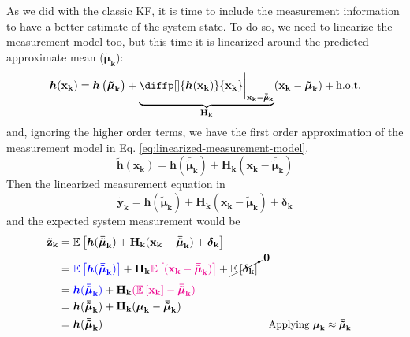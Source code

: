 \documentclass[12pt]{article}
\newcommand{\bvec}[1]{\boldsymbol{\mathbf{#1}}} %
\newcommand{\mat}[1]{\boldsymbol{\mathbf{#1}}}
\newcommand{\brac}[1]{\left[#1\right]} %
\newcommand{\parentheses}[1]{\left(#1\right)}
\newcommand{\mb}[1]{{\boldsymbol{#1}}} %
\newcommand{\expv}[1]{\mathbb{E}\brac{#1}} %
\newcommand{\hot}{\text{h.o.t.}}
\newcommand{\blue}[1]{\color{blue}#1\color{black}}
\newcommand{\magenta}[1]{\color{magenta}#1\color{black}}
\begin{document}
As we did with the classic KF, it is time to include the measurement information to have a better estimate of the system state. To do so, we need to linearize the measurement model too, but this time it is linearized around the predicted approximate mean ($\mb{\bar{\tilde{\mu}}}_\mathbf{k}$):
\begin{equation*}
    \mb{h}(\bvec{x_k}) = \mb{h}\parentheses{\mb{\bar{\tilde{\mu}}}_\mathbf{k}} + \underbrace{\diffp[]{\mb{h}(\bvec{x_k})}{\bvec{x_{k}}} \bigg\lvert_{\bvec{x_k}=\bar{\mb{\tilde{\mu}}}_\mathbf{k}}}_{\mat{H_k}} (\bvec{x_k} - \mb{\bar{\tilde{\mu}}}_\mathbf{k}) + \hot
\end{equation*}
and, ignoring the higher order terms, we have the first order approximation of the measurement model in Eq. \ref{eq:linearized-measurement-model}.
\begin{equation}
    \mb{\tilde{h}}(\bvec{x_k}) = \mb{h}(\mb{\bar{\tilde\mu}}_\mathbf{k}) + \mat{H_k} (\bvec{x_k} - \mb{\bar{\tilde\mu}}_\mathbf{k})
    \label{eq:linearized-measurement-model} 
\end{equation}
Then the linearized measurement equation in
\begin{equation}
    \bvec{\tilde{y}_k} = \mb{h}(\mb{\bar{\tilde\mu}}_\mathbf{k}) + \mat{H_k}(\bvec{x_k} - \mb{\bar{\tilde{\mu}}}_\mathbf{k}) + \mb{\delta}_\mathbf{k}
\end{equation}
and the expected system measurement would be
\begin{equation}
\begin{aligned}
    \bvec{\tilde{z}_k} &= \expv{\mb{h}(\mb{\bar{\tilde\mu}}_\mathbf{k}) + \mat{H_k}(\bvec{x_k} - \mb{\bar{\tilde{\mu}}}_\mathbf{k}) + \mb{\delta}_\mathbf{k}}\\
    &= \blue{\expv{\mb{h}(\mb{\bar{\tilde\mu}}_\mathbf{k})}} + \mat{H_k}\magenta{\expv{(\bvec{x_k} - \mb{\bar{\tilde{\mu}}}_\mathbf{k})}} + \cancelto{\mat{0}}{\expv{\mb{\delta}_\mathbf{k}}}\\
    &= \blue{\mb{h}(\mb{\bar{\tilde\mu}}_\mathbf{k})} + \mat{H_k}\magenta{(\expv{\bvec{x_k}} - \mb{\bar{\tilde{\mu}}}_\mathbf{k})}\\
    &= \mb{h}(\mb{\bar{\tilde\mu}}_\mathbf{k}) + \mat{H_k}(\mb{\mu}_\mathbf{k} - \mb{\bar{\tilde{\mu}}}_\mathbf{k})\\
    &= \mb{h}(\mb{\bar{\tilde\mu}}_\mathbf{k}) && \small\text{Applying $\mb{\mu}_\mathbf{k} \approx \mb{\bar{\tilde{\mu}}}_\mathbf{k}$}
\end{aligned}
\end{equation}
\end{document}
